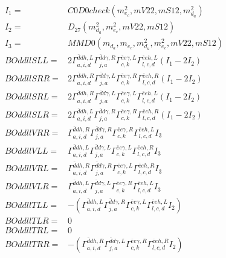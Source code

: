 \documentclass[A4,landscape]{article}
\begin{document}
\begin{align} 
I_1 = & C0D0check(m^2_{e_{{c}}}, mV22, mS12, m^2_{d_{{a}}}) \\ 
I_2 = & D_{27}(m^2_{d_{{a}}}, m^2_{e_{{c}}}, mV22, mS12) \\ 
I_3 = & MMD0(m_{d_{{a}}}, m_{e_{{c}}}, m^2_{d_{{a}}}, m^2_{e_{{c}}}, mV22, mS12) \\ 
  BOddllSLL= & 2  \Gamma^{\bar{d}d h ,L}_{a, i, d} \Gamma^{\bar{d}d \gamma ,R}_{j, a} \Gamma^{\bar{e}e \gamma ,L}_{c, k} \Gamma^{\bar{e}e h ,L}_{l, c, d} (I_1 - 2 I_2) \\ 
  BOddllSRR= & 2  \Gamma^{\bar{d}d h ,R}_{a, i, d} \Gamma^{\bar{d}d \gamma ,L}_{j, a} \Gamma^{\bar{e}e \gamma ,R}_{c, k} \Gamma^{\bar{e}e h ,R}_{l, c, d} (I_1 - 2 I_2) \\ 
  BOddllSRL= & 2  \Gamma^{\bar{d}d h ,R}_{a, i, d} \Gamma^{\bar{d}d \gamma ,L}_{j, a} \Gamma^{\bar{e}e \gamma ,L}_{c, k} \Gamma^{\bar{e}e h ,L}_{l, c, d} (I_1 - 2 I_2) \\ 
  BOddllSLR= & 2  \Gamma^{\bar{d}d h ,L}_{a, i, d} \Gamma^{\bar{d}d \gamma ,R}_{j, a} \Gamma^{\bar{e}e \gamma ,R}_{c, k} \Gamma^{\bar{e}e h ,R}_{l, c, d} (I_1 - 2 I_2) \\ 
  BOddllVRR= &  \Gamma^{\bar{d}d h ,R}_{a, i, d} \Gamma^{\bar{d}d \gamma ,R}_{j, a} \Gamma^{\bar{e}e \gamma ,R}_{c, k} \Gamma^{\bar{e}e h ,L}_{l, c, d} I_3 \\ 
  BOddllVLL= &  \Gamma^{\bar{d}d h ,L}_{a, i, d} \Gamma^{\bar{d}d \gamma ,L}_{j, a} \Gamma^{\bar{e}e \gamma ,L}_{c, k} \Gamma^{\bar{e}e h ,R}_{l, c, d} I_3 \\ 
  BOddllVRL= &  \Gamma^{\bar{d}d h ,R}_{a, i, d} \Gamma^{\bar{d}d \gamma ,R}_{j, a} \Gamma^{\bar{e}e \gamma ,L}_{c, k} \Gamma^{\bar{e}e h ,R}_{l, c, d} I_3 \\ 
  BOddllVLR= &  \Gamma^{\bar{d}d h ,L}_{a, i, d} \Gamma^{\bar{d}d \gamma ,L}_{j, a} \Gamma^{\bar{e}e \gamma ,R}_{c, k} \Gamma^{\bar{e}e h ,L}_{l, c, d} I_3 \\ 
  BOddllTLL= & -( \Gamma^{\bar{d}d h ,L}_{a, i, d} \Gamma^{\bar{d}d \gamma ,R}_{j, a} \Gamma^{\bar{e}e \gamma ,L}_{c, k} \Gamma^{\bar{e}e h ,L}_{l, c, d} I_2) \\ 
  BOddllTLR= & 0 \\ 
  BOddllTRL= & 0 \\ 
  BOddllTRR= & -( \Gamma^{\bar{d}d h ,R}_{a, i, d} \Gamma^{\bar{d}d \gamma ,L}_{j, a} \Gamma^{\bar{e}e \gamma ,R}_{c, k} \Gamma^{\bar{e}e h ,R}_{l, c, d} I_2) \\ 
\end{align} 
\end{document}
